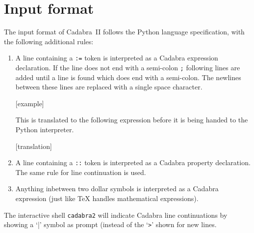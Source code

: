 \section{Input format}

The input format of Cadabra~II follows the Python language
specification, with the following additional rules:
\begin{enumerate}
\item A line containing a \verb|:=| token is interpreted as a Cadabra
  expression declaration. If the line does not end with a semi-colon
  \verb|;| following lines are added until a line is found which does
  end with a semi-colon. The newlines between these lines are replaced
  with a single space character.

  [example]

  This is translated to the following expression before it is being
  handed to the Python interpreter.

  [translation]

\item A line containing a \verb|::| token is interpreted as a Cadabra
  property declaration. The same rule for line continuation is used.

\item Anything inbetween two dollar symbols is interpreted as a
  Cadabra expression (just like \TeX{} handles mathematical
  expressions).
\end{enumerate}
The interactive shell \verb|cadabra2| will indicate Cadabra line
continuations by showing a `|' symbol as prompt (instead of the
`\verb|>|' shown for new lines.
